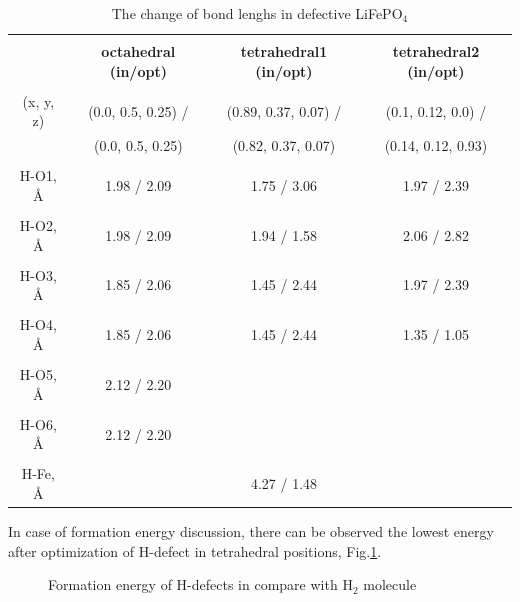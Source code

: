 \documentclass[11pt]{article}
\begin{document}
\begin{table}[H]
\footnotesize{
\caption{The change of bond lenghs in defective LiFePO$_4$}
\label{tabular:change}
\begin{center}
\begin{tabular}{|c|c|c|c|}
\hline
& & & \\
 \textbf{ } & \textbf{octahedral (in/opt)}& \textbf{tetrahedral1 (in/opt)}  & \textbf{tetrahedral2 (in/opt)}  \\
\hline
& & & \\
(x, y, z) & (0.0, 0.5, 0.25) / &  (0.89, 0.37, 0.07) /  & (0.1, 0.12, 0.0) /  \\ 
 & (0.0, 0.5, 0.25)  &   (0.82, 0.37, 0.07) & (0.14, 0.12, 0.93) \\ 
\hline
& & & \\
H-O1, \AA & 1.98 / 2.09 &  1.75 / 3.06 & 1.97 / 2.39 \\ 
\hline
& & & \\
H-O2, \AA & 1.98 / 2.09 & 1.94 / 1.58 & 2.06 / 2.82 \\
\hline
& & & \\
H-O3, \AA & 1.85 / 2.06 & 1.45 / 2.44 & 1.97 / 2.39 \\
\hline
& & & \\
H-O4, \AA & 1.85 / 2.06 & 1.45 / 2.44 & 1.35 / 1.05 \\
\hline
& & & \\
H-O5, \AA & 2.12 / 2.20 &  &  \\
\hline
& & & \\
H-O6, \AA & 2.12 / 2.20 & & \\
\hline
& & & \\
H-Fe, \AA &  & 4.27 / 1.48 &  \\
\hline
\end{tabular}
\end{center}
}
\end{table}

In case of formation energy discussion, there can be observed the lowest energy after optimization of H-defect in tetrahedral positions, Fig.\ref{foren}.

\begin{figure}[H]
\begin{minipage}[h]{1\linewidth}
\end{minipage}
\caption{Formation energy of H-defects in compare with H$_2$ molecule}
\label{foren}
\end{figure}
\end{document}
